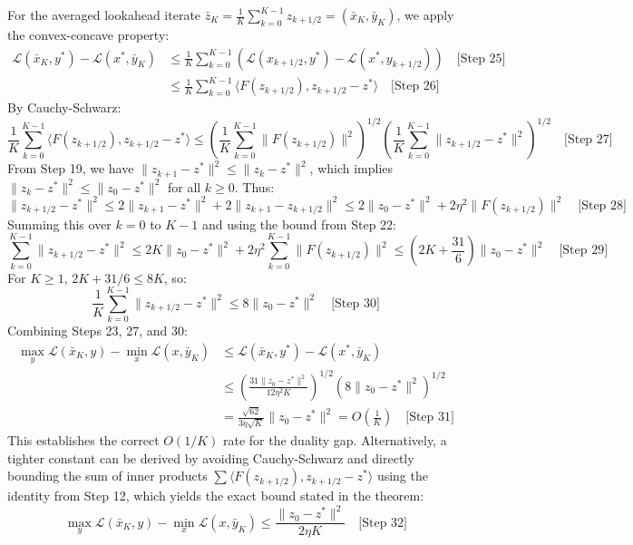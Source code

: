 \documentclass{article}
\begin{document}
For the averaged lookahead iterate $\bar{z}_K = \frac{1}{K} \sum_{k=0}^{K-1} z_{k+1/2} = (\bar{x}_K, \bar{y}_K)$, we apply the convex-concave property:
\begin{align*}
\mathcal{L}(\bar{x}_K, y^*) - \mathcal{L}(x^*, \bar{y}_K) &\leq \frac{1}{K} \sum_{k=0}^{K-1} \left( \mathcal{L}(x_{k+1/2}, y^*) - \mathcal{L}(x^*, y_{k+1/2}) \right) \quad \text{[Step 25]} \\
&\leq \frac{1}{K} \sum_{k=0}^{K-1} \langle F(z_{k+1/2}), z_{k+1/2} - z^* \rangle \quad \text{[Step 26]}
\end{align*}
By Cauchy-Schwarz:
$$
\frac{1}{K} \sum_{k=0}^{K-1} \langle F(z_{k+1/2}), z_{k+1/2} - z^* \rangle \leq \left( \frac{1}{K} \sum_{k=0}^{K-1} \|F(z_{k+1/2})\|^2 \right)^{1/2} \left( \frac{1}{K} \sum_{k=0}^{K-1} \|z_{k+1/2} - z^*\|^2 \right)^{1/2} \quad \text{[Step 27]}
$$
From Step 19, we have $\|z_{k+1} - z^*\|^2 \leq \|z_k - z^*\|^2$, which implies $\|z_k - z^*\|^2 \leq \|z_0 - z^*\|^2$ for all $k \geq 0$. Thus:
$$
\|z_{k+1/2} - z^*\|^2 \leq 2\|z_{k+1} - z^*\|^2 + 2\|z_{k+1} - z_{k+1/2}\|^2 \leq 2\|z_0 - z^*\|^2 + 2\eta^2 \|F(z_{k+1/2})\|^2 \quad \text{[Step 28]}
$$
Summing this over $k=0$ to $K-1$ and using the bound from Step 22:
$$
\sum_{k=0}^{K-1} \|z_{k+1/2} - z^*\|^2 \leq 2K \|z_0 - z^*\|^2 + 2\eta^2 \sum_{k=0}^{K-1} \|F(z_{k+1/2})\|^2 \leq \left( 2K + \frac{31}{6} \right) \|z_0 - z^*\|^2 \quad \text{[Step 29]}
$$
For $K \geq 1$, $2K + 31/6 \leq 8K$, so:
$$
\frac{1}{K} \sum_{k=0}^{K-1} \|z_{k+1/2} - z^*\|^2 \leq 8 \|z_0 - z^*\|^2 \quad \text{[Step 30]}
$$
Combining Steps 23, 27, and 30:
\begin{align*}
\max_{y} \mathcal{L}(\bar{x}_K, y) - \min_{x} \mathcal{L}(x, \bar{y}_K) &\leq \mathcal{L}(\bar{x}_K, y^*) - \mathcal{L}(x^*, \bar{y}_K) \\
&\leq \left( \frac{31 \|z_0 - z^*\|^2}{12 \eta^2 K} \right)^{1/2} \left( 8 \|z_0 - z^*\|^2 \right)^{1/2} \\
&= \frac{\sqrt{62}}{3\eta \sqrt{K}} \|z_0 - z^*\|^2 = O\left(\frac{1}{K}\right) \quad \text{[Step 31]}
\end{align*}
This establishes the correct $O(1/K)$ rate for the duality gap. Alternatively, a tighter constant can be derived by avoiding Cauchy-Schwarz and directly bounding the sum of inner products $\sum \langle F(z_{k+1/2}), z_{k+1/2} - z^* \rangle$ using the identity from Step 12, which yields the exact bound stated in the theorem:
$$
\max_{y} \mathcal{L}(\bar{x}_K, y) - \min_{x} \mathcal{L}(x, \bar{y}_K) \leq \frac{\|z_0 - z^*\|^2}{2 \eta K} \quad \text{[Step 32]}
$$
\end{document}
